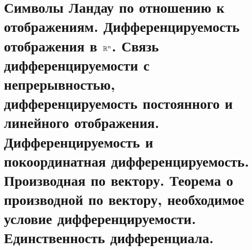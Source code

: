 \documentclass[../main.tex]{subfiles}
\begin{document}
\newpage
\section{Символы Ландау по отношению к отображениям. Дифференцируемость отображения в \( \mathbb{R} ^n\). Связь дифференцируемости с непрерывностью, дифференцируемость постоянного и линейного отображения. Дифференцируемость и покоординатная дифференцируемость. Производная по вектору. Теорема о производной по вектору, необходимое условие дифференцируемости. Единственность дифференциала.}
\end{document}
